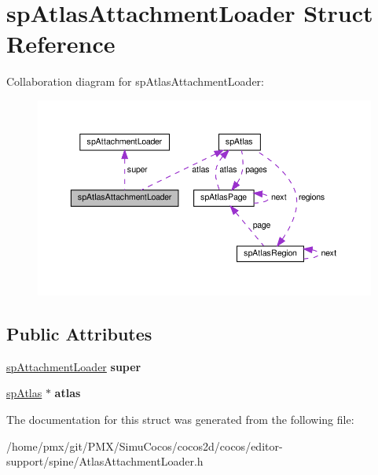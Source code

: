 \hypertarget{structspAtlasAttachmentLoader}{}\section{sp\+Atlas\+Attachment\+Loader Struct Reference}
\label{structspAtlasAttachmentLoader}


Collaboration diagram for sp\+Atlas\+Attachment\+Loader\+:
\nopagebreak
\begin{figure}[H]
\begin{center}
\leavevmode
\includegraphics[width=350pt]{structspAtlasAttachmentLoader__coll__graph}
\end{center}
\end{figure}
\subsection*{Public Attributes}
\begin{DoxyCompactItemize}
\item 
\mbox{\label{structspAtlasAttachmentLoader_a1b1c7d029dbcae410ebdbf018b482584}} 
\hyperlink{structspAttachmentLoader}{sp\+Attachment\+Loader} {\bfseries super}
\item 
\mbox{\label{structspAtlasAttachmentLoader_ac9709ff5690cd5f30067ebc028ed76c1}} 
\hyperlink{structspAtlas}{sp\+Atlas} $\ast$ {\bfseries atlas}
\end{DoxyCompactItemize}


The documentation for this struct was generated from the following file\+:\begin{DoxyCompactItemize}
\item 
/home/pmx/git/\+P\+M\+X/\+Simu\+Cocos/cocos2d/cocos/editor-\/support/spine/Atlas\+Attachment\+Loader.\+h\end{DoxyCompactItemize}
